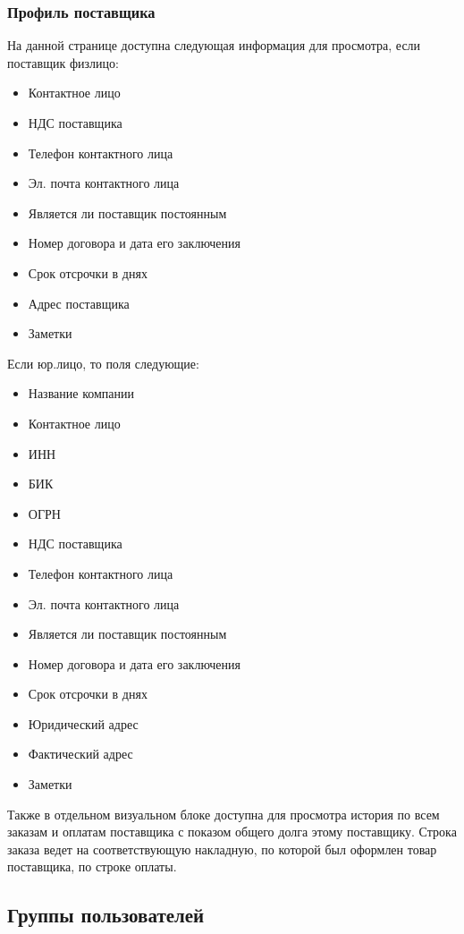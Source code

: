 \documentclass[DIV=calc, paper=a4, fontsize=11pt]{scrartcl} %
\begin{document}
\subsubsection{Профиль поставщика}

На данной странице доступна следующая информация для просмотра, если поставщик физлицо:

\begin{itemize}
	\item Контактное лицо
	\item НДС поставщика
	\item Телефон контактного лица
	\item Эл. почта контактного лица
	\item Является ли поставщик постоянным
	\item Номер договора и дата его заключения
	\item Срок отсрочки в днях
	\item Адрес поставщика
	\item Заметки
\end{itemize}

Если юр.лицо, то поля следующие:

\begin{itemize}
	\item Название компании
	\item Контактное лицо
	\item ИНН
	\item БИК
	\item ОГРН
	\item НДС поставщика
	\item Телефон контактного лица
	\item Эл. почта контактного лица
	\item Является ли поставщик постоянным
	\item Номер договора и дата его заключения
	\item Срок отсрочки в днях
	\item Юридический адрес
	\item Фактический адрес
	\item Заметки
\end{itemize}

Также в отдельном визуальном блоке доступна для просмотра история по всем заказам и оплатам поставщика с показом общего долга этому поставщику. Строка заказа ведет на соответствующую накладную, по которой был оформлен товар поставщика, по строке оплаты.


\subsection{Группы пользователей}
\end{document}
